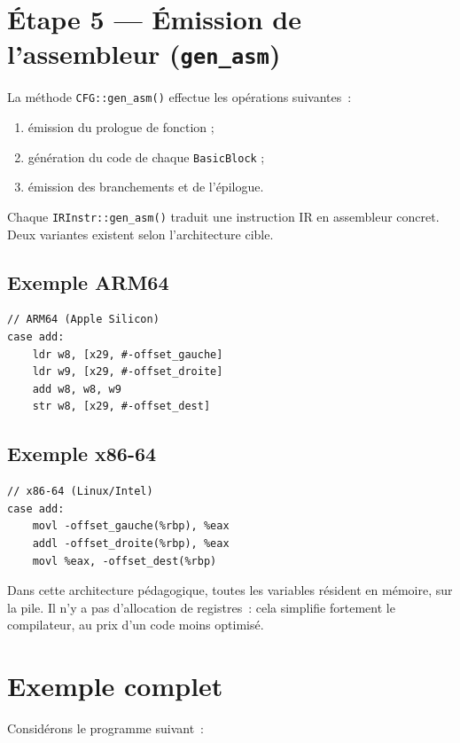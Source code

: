 \documentclass[11pt,a4paper]{article}
\begin{document}
\section{Étape 5 --- Émission de l'assembleur (\texttt{gen\_asm})}

La méthode \texttt{CFG::gen\_asm()} effectue les opérations suivantes~:

\begin{enumerate}
  \item émission du prologue de fonction ;
  \item génération du code de chaque \texttt{BasicBlock} ;
  \item émission des branchements et de l'épilogue.
\end{enumerate}

Chaque \texttt{IRInstr::gen\_asm()} traduit une instruction IR en assembleur concret. Deux variantes existent selon l'architecture cible.

\subsection{Exemple ARM64}

\begin{lstlisting}
// ARM64 (Apple Silicon)
case add:
    ldr w8, [x29, #-offset_gauche]
    ldr w9, [x29, #-offset_droite]
    add w8, w8, w9
    str w8, [x29, #-offset_dest]
\end{lstlisting}

\subsection{Exemple x86-64}

\begin{lstlisting}
// x86-64 (Linux/Intel)
case add:
    movl -offset_gauche(%rbp), %eax
    addl -offset_droite(%rbp), %eax
    movl %eax, -offset_dest(%rbp)
\end{lstlisting}

Dans cette architecture pédagogique, toutes les variables résident en mémoire, sur la pile. Il n'y a pas d'allocation de registres~: cela simplifie fortement le compilateur, au prix d'un code moins optimisé.

\section{Exemple complet}

Considérons le programme suivant~:
\end{document}
